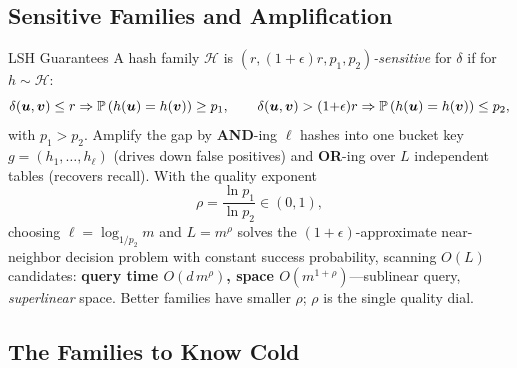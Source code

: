 \subsection{Sensitive Families and Amplification}

\begin{mathresult}{LSH Guarantees}
A hash family $\mathcal{H}$ is \emph{$(r, (1{+}\epsilon)r, p_1, p_2)$-sensitive} for $\delta$ if for $h \sim \mathcal{H}$:
\begin{equation}
\delta(\bm{u},\bm{v}) \le r \Rightarrow \mathbb{P}\left(h(\bm{u}) = h(\bm{v})\right) \ge p_1,
\qquad
\delta(\bm{u},\bm{v}) > (1{+}\epsilon) r \Rightarrow \mathbb{P}\left(h(\bm{u}) = h(\bm{v})\right) \le p_2,
\end{equation}
with $p_1 > p_2$. Amplify the gap by \textbf{AND}-ing $\ell$ hashes into one bucket key $g = (h_1, \ldots, h_\ell)$ (drives down false positives) and \textbf{OR}-ing over $L$ independent tables (recovers recall). With the quality exponent
\begin{equation}
\rho = \frac{\ln p_1}{\ln p_2} \in (0,1),
\end{equation}
choosing $\ell = \log_{1/p_2} m$ and $L = m^{\rho}$ solves the $(1{+}\epsilon)$-approximate near-neighbor decision problem with constant success probability, scanning $O(L)$ candidates: \textbf{query time $O(d \, m^{\rho})$, space $O(m^{1+\rho})$}---sublinear query, \emph{superlinear} space. Better families have smaller $\rho$; $\rho$ is the single quality dial.
\end{mathresult}

\subsection{The Families to Know Cold}

